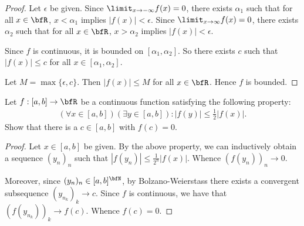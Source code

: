 \documentclass[11pt,twoside,openany]{memoir}
\begin{document}
        \begin{proof}
            Let $\epsilon$ be given. Since $\limit_{x \rightarrow -\infty}f(x) = 0$, there exists $\alpha_1$ such that for all $x \in \bfR$, $x < \alpha_1$ implies $|f(x)| < \epsilon$. Since $\limit_{x \rightarrow \infty}f(x) = 0$, there exists $\alpha_2$ such that for all $x \in \bfR$, $x > \alpha_2$ implies $|f(x)| < \epsilon$. \nl
            
            Since $f$ is continuous, it is bounded on $[\alpha_1,\alpha_2]$. So there exists $c$ such that $|f(x)| \leq c$ for all $x \in [\alpha_1,\alpha_2]$. \nl
            
            Let $M = \max\{\epsilon,c\}$. Then $|f(x)| \leq M$ for all $x \in \bfR$. Hence $f$ is bounded.
        \end{proof}
\addtocounter{exercise}{1}
    \begin{exercise}
        Let $f:[a,b] \rightarrow \bfR$ be a continuous function satisfying the following property:
            \begin{equation*}
            \begin{split}
                (\forall x \in [a,b])(\exists y \in [a,b]) :|f(y)| \leq \frac{1}{2}|f(x)|.
            \end{split}
            \end{equation*}
        Show that there is a $c \in [a,b]$ with $f(c) = 0$.
    \end{exercise}
        \begin{proof}
            Let $x \in [a,b]$ be given. By the above property, we can inductively obtain a sequence $(y_n)_n$ such that $|f(y_n)| \leq \frac{1}{2^n}|f(x)|$. Whence $(f(y_n))_n \rightarrow 0$. \nl
            
            Moreover, since $(y_n)_n \in [a,b]^\bfN$, by Bolzano-Weierstass there exists a convergent subsequence $(y_{n_k})_k \rightarrow c$. Since $f$ is continuous, we have that $(f(y_{n_k}))_k \rightarrow f(c)$. Whence $f(c) = 0$.
        \end{proof}
\end{document}
